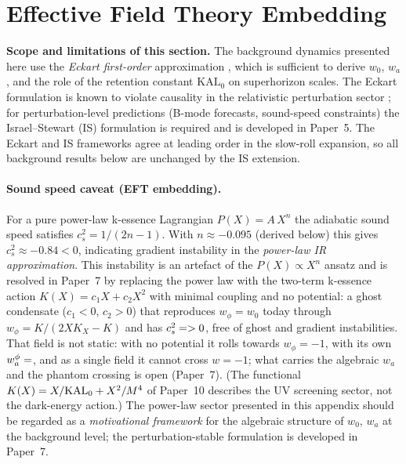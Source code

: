 
\section{Effective Field Theory Embedding}
\label{sec:eft}

\textbf{Scope and limitations of this section.}
The background dynamics presented here use the \emph{Eckart first-order}
approximation \citep{Eckart1940}, which is sufficient to derive $w_0$, $w_a$,
and the role of the retention constant $\mathrm{KAL}_0$ on superhorizon scales.
The Eckart formulation is known to violate causality in the relativistic
perturbation sector \citep{Muller1967,HiscockLindblom1983,HiscockLindblom1985}; for perturbation-level predictions
(B-mode forecasts, sound-speed constraints) the Israel--Stewart (IS) formulation
is required and is developed in Paper~5.
The Eckart and IS frameworks agree at leading order in the slow-roll expansion,
so all background results below are unchanged by the IS extension.

\paragraph{Sound speed caveat (EFT embedding).}
For a pure power-law k-essence Lagrangian $P(X)=A\,X^n$ the adiabatic
sound speed satisfies $c_s^2 = 1/(2n-1)$.  With $n\approx-0.095$ (derived below)
this gives $c_s^2\approx-0.84<0$, indicating gradient instability in the
\emph{power-law IR approximation}.  This instability is an artefact of the
$P(X)\propto X^n$ ansatz and is resolved in Paper~7 by replacing the
power law with the two-term k-essence action \citep{ArmendarizPicon2001}
$K(X)=c_1X+c_2X^2$ with minimal coupling and no potential: a ghost condensate
($c_1<0$, $c_2>0$) that reproduces $w_\phi=w_0$ today through
$w_\phi=K/(2XK_X-K)$ and has $c_s^2=\val{cs2_condensado_d6}>0$, free of ghost and
gradient instabilities.  That field is not static: with no potential it rolls
towards $w_\phi=-1$, with its own $w_a^\phi=\val{p7_wa_campo}$, and as a single field it
cannot cross $w=-1$; what carries the algebraic $w_a$ and the phantom crossing is
open (Paper~7). (The functional $K(X)=X/\mathrm{KAL}_0+X^2/M^4$ of Paper~10 describes
the UV screening sector, not the dark-energy action.)
The power-law sector presented in this appendix should be regarded as a
\emph{motivational framework} for the algebraic structure of $w_0$, $w_a$
at the background level; the perturbation-stable formulation is developed
in Paper~7.

